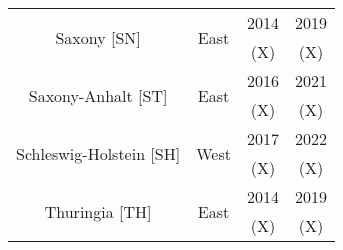\documentclass[a4paper]{scrreprt}
\begin{document}
\begin{table}
\begin{center}
\begin{tabular}{c c c c}
    \hline
    \multirow{2}{*}{Saxony [SN]} & \multirow{2}{*}{East} & 2014 & 2019 \\ && (X) & (X) \\
    \hline
    \multirow{2}{*}{Saxony-Anhalt [ST]} & \multirow{2}{*}{East} & 2016 & 2021 \\ && (X) & (X) \\
    \hline
    \multirow{2}{*}{Schleswig-Holstein [SH]} & \multirow{2}{*}{West} & 2017 & 2022 \\ && (X) & (X) \\
    \hline
    \multirow{2}{*}{Thuringia [TH]} & \multirow{2}{*}{East} & 2014 & 2019 \\ && (X) & (X) \\
    \hline
\end{tabular}\end{center}\end{table}
\end{document}
